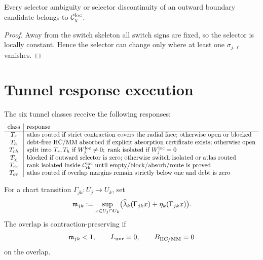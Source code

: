 \begin{lemma}
Every selector ambiguity or selector discontinuity of an outward boundary candidate belongs to \(\mathcal C_{\chi}^{\mathrm{loc}}\).
\end{lemma}

\begin{proof}
Away from the switch skeleton all switch signs are fixed, so the selector is locally constant. Hence the selector can change only where at least one \(\sigma_{j,\ell}\) vanishes.
\end{proof}

\section{Tunnel response execution}

The six tunnel classes receive the following responses:
\[
\begin{array}{c|l}
\text{class} & \text{response}\\
\hline
T_r & \text{atlas routed if strict contraction covers the radial face; otherwise open or blocked}\\
T_h & \text{debt-free HC/MM absorbed if explicit absorption certificate exists; otherwise open}\\
T_{rh} & \text{split into }T_r,T_h\text{ if }W_j^{\mathrm{loc}}\ne0;\text{ rank isolated if }W_j^{\mathrm{loc}}=0\\
T_{\chi} & \text{blocked if outward selector is zero; otherwise switch isolated or atlas routed}\\
T_{\mathrm{rk}} & \text{rank isolated inside }\mathcal C_{\mathrm{rk}}^{\mathrm{loc}}\text{ until empty/block/absorb/route is proved}\\
T_{\mathrm{ov}} & \text{atlas routed if overlap margins remain strictly below one and debt is zero}
\end{array}
\]

\begin{definition}
For a chart transition \(\Gamma_{jk}:U_j\to U_k\), set
\[
\mathfrak m_{jk}
:=
\sup_{x\in U_j\cap U_k}
\bigl(\widehat\lambda_k(\Gamma_{jk}x)+\eta_k(\Gamma_{jk}x)\bigr).
\]
The overlap is contraction-preserving if
\[
\mathfrak m_{jk}<1,
\qquad
L_{\mathrm{unr}}=0,
\qquad
B_{\mathrm{HC}/\mathrm{MM}}=0
\]
on the overlap.
\end{definition}

